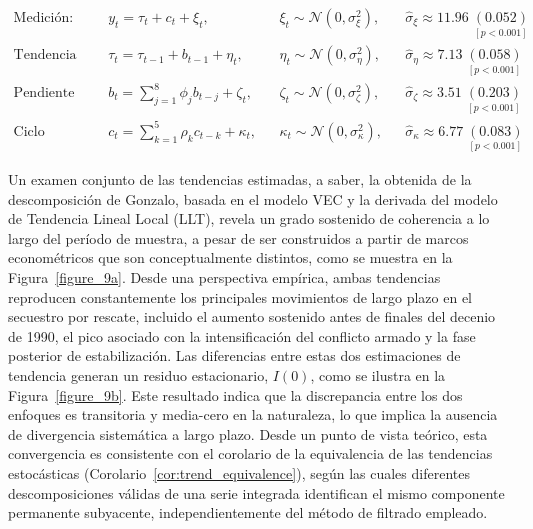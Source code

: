 \documentclass[12pt]{article}
\theoremstyle{definition}
\theoremstyle{remark}
\newcommand{\1}{\mathbf{1}}
\begin{document}
\begin{equation}
\begin{aligned}
    \text{Medición:} \quad & y_t = \tau_t + c_t + \xi_t, 
    && \xi_t \sim \mathcal{N}(0, \sigma_\xi^2), 
    && \hat{\sigma}_\xi \approx 11.96 \; \underset{[p<0.001]}{(0.052)} \\[10pt]
    \text{Tendencia estocástica:} \quad & \tau_t = \tau_{t-1} + b_{t-1} + \eta_t, 
    && \eta_t \sim \mathcal{N}(0, \sigma_\eta^2), 
    && \hat{\sigma}_\eta \approx 7.13 \; \underset{[p<0.001]}{(0.058)} \\[10pt]
    \text{Pendiente estocástica:} \quad & b_t = \sum_{j=1}^{8} \phi_j b_{t-j} + \zeta_t, 
    && \zeta_t \sim \mathcal{N}(0, \sigma_\zeta^2), 
    && \hat{\sigma}_\zeta \approx 3.51 \; \underset{[p<0.001]}{(0.203)} \\[10pt]
    \text{Ciclo estocástico:} \quad & c_t = \sum_{k=1}^{5} \rho_k c_{t-k} + \kappa_t, 
    && \kappa_t \sim \mathcal{N}(0, \sigma_\kappa^2), 
    && \hat{\sigma}_\kappa \approx 6.77 \; \underset{[p<0.001]}{(0.083)}
\end{aligned}
\label{eq_9}
\end{equation}

Un examen conjunto de las tendencias estimadas, a saber, la obtenida de la descomposición de Gonzalo, basada en el modelo VEC y la derivada del modelo de Tendencia Lineal Local (LLT), revela un grado sostenido de coherencia a lo largo del período de muestra, a pesar de ser construidos a partir de marcos econométricos que son conceptualmente distintos, como se muestra en la Figura~\ref{figure_9a}. Desde una perspectiva empírica, ambas tendencias reproducen constantemente los principales movimientos de largo plazo en el secuestro por rescate, incluido el aumento sostenido antes de finales del decenio de 1990, el pico asociado con la intensificación del conflicto armado y la fase posterior de estabilización. Las diferencias entre estas dos estimaciones de tendencia generan un residuo estacionario, $I(0)$, como se ilustra en la Figura~\ref{figure_9b}. Este resultado indica que la discrepancia entre los dos enfoques es transitoria y media-cero en la naturaleza, lo que implica la ausencia de divergencia sistemática a largo plazo. Desde un punto de vista teórico, esta convergencia es consistente con el corolario de la equivalencia de las tendencias estocásticas (Corolario~\ref{cor:trend_equivalence}), según las cuales diferentes descomposiciones válidas de una serie integrada identifican el mismo componente permanente subyacente, independientemente del método de filtrado empleado.
\end{document}
